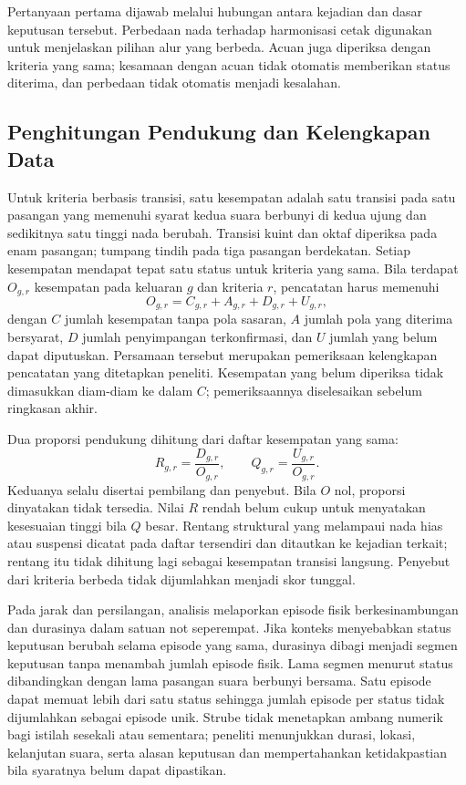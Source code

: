 Pertanyaan pertama dijawab melalui hubungan antara kejadian dan dasar keputusan tersebut. Perbedaan nada terhadap harmonisasi cetak digunakan untuk menjelaskan pilihan alur yang berbeda. Acuan juga diperiksa dengan kriteria yang sama; kesamaan dengan acuan tidak otomatis memberikan status diterima, dan perbedaan tidak otomatis menjadi kesalahan.

\subsection{Penghitungan Pendukung dan Kelengkapan Data}

Untuk kriteria berbasis transisi, satu kesempatan adalah satu transisi pada satu pasangan yang memenuhi syarat kedua suara berbunyi di kedua ujung dan sedikitnya satu tinggi nada berubah. Transisi kuint dan oktaf diperiksa pada enam pasangan; tumpang tindih pada tiga pasangan berdekatan. Setiap kesempatan mendapat tepat satu status untuk kriteria yang sama. Bila terdapat $O_{g,r}$ kesempatan pada keluaran $g$ dan kriteria $r$, pencatatan harus memenuhi
\begin{equation}
O_{g,r}=C_{g,r}+A_{g,r}+D_{g,r}+U_{g,r},
\end{equation}
dengan $C$ jumlah kesempatan tanpa pola sasaran, $A$ jumlah pola yang diterima bersyarat, $D$ jumlah penyimpangan terkonfirmasi, dan $U$ jumlah yang belum dapat diputuskan. Persamaan tersebut merupakan pemeriksaan kelengkapan pencatatan yang ditetapkan peneliti. Kesempatan yang belum diperiksa tidak dimasukkan diam-diam ke dalam $C$; pemeriksaannya diselesaikan sebelum ringkasan akhir.

Dua proporsi pendukung dihitung dari daftar kesempatan yang sama:
\begin{equation}
R_{g,r}=\frac{D_{g,r}}{O_{g,r}},\qquad
Q_{g,r}=\frac{U_{g,r}}{O_{g,r}}.
\end{equation}
Keduanya selalu disertai pembilang dan penyebut. Bila $O$ nol, proporsi dinyatakan tidak tersedia. Nilai $R$ rendah belum cukup untuk menyatakan kesesuaian tinggi bila $Q$ besar. Rentang struktural yang melampaui nada hias atau suspensi dicatat pada daftar tersendiri dan ditautkan ke kejadian terkait; rentang itu tidak dihitung lagi sebagai kesempatan transisi langsung. Penyebut dari kriteria berbeda tidak dijumlahkan menjadi skor tunggal.

Pada jarak dan persilangan, analisis melaporkan episode fisik berkesinambungan dan durasinya dalam satuan not seperempat. Jika konteks menyebabkan status keputusan berubah selama episode yang sama, durasinya dibagi menjadi segmen keputusan tanpa menambah jumlah episode fisik. Lama segmen menurut status dibandingkan dengan lama pasangan suara berbunyi bersama. Satu episode dapat memuat lebih dari satu status sehingga jumlah episode per status tidak dijumlahkan sebagai episode unik. Strube tidak menetapkan ambang numerik bagi istilah sesekali atau sementara; peneliti menunjukkan durasi, lokasi, kelanjutan suara, serta alasan keputusan dan mempertahankan ketidakpastian bila syaratnya belum dapat dipastikan.

